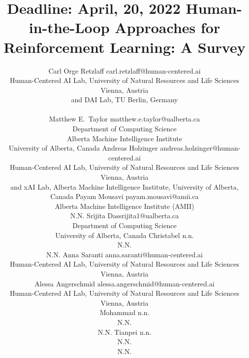 \documentclass[twoside,11pt]{article}
\begin{document}
\title{Deadline: April, 20, 2022 Human-in-the-Loop Approaches for Reinforcement Learning: A Survey}

\author{\name Carl Orge Retzlaff \email carl.retzlaff@human-centered.ai\\ 
\addr Human-Centered AI Lab, University of Natural Resources and Life Sciences Vienna, Austria\\
and DAI Lab, TU Berlin, Germany\\ \\
\AND
\name Matthew E.~Taylor \email matthew.e.taylor@ualberta.ca \\
\addr Department of Computing Science\\
Alberta Machine Intelligence Institute\\
University of Alberta, Canada
\AND
\name Andreas Holzinger \email andreas.holzinger@human-centered.ai \\
\addr Human-Centered AI Lab, University of Natural Resources and Life Sciences Vienna, Austria \\
and xAI Lab, Alberta Machine Intelligence Institute, University of Alberta, Canada
\AND
\name Payam Mousavi \email payam.mousavi@amii.ca \\
\addr Alberta Machine Intelligence Institute (AMII) \\ N.N.
\AND
\name Srijita Das\email srijita1@ualberta.ca \\
\addr Department of Computing Science \\ 
University of Alberta, Canada
\AND
\name Christabel \email n.n. \\
\addr N.N. \\ N.N.
\AND
\name Anna Saranti \email anna.saranti@human-centered.ai \\
\addr Human-Centered AI Lab, University of Natural Resources and Life Sciences Vienna, Austria\\
\AND
\name Alessa Angerschmid \email alessa.angerschmid@human-centered.ai \\
\addr Human-Centered AI Lab, University of Natural Resources and Life Sciences Vienna, Austria\\
\AND
\name Mohammad \email n.n. \\
\addr N.N. \\ N.N.
\AND
\name Tianpei \email n.n. \\
\addr N.N. \\ N.N.
}



\maketitle
\end{document}
